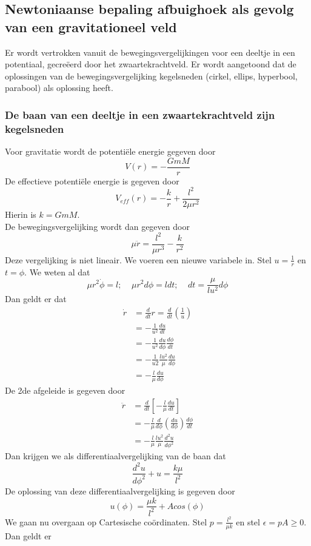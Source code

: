 \subsection{Newtoniaanse bepaling afbuighoek als gevolg van een gravitationeel veld}
Er wordt vertrokken vanuit de bewegingsvergelijkingen voor een deeltje in een potentiaal, gecreëerd door het zwaartekrachtveld. Er wordt aangetoond dat de oplossingen van de bewegingsvergelijking kegelsneden (cirkel, ellips, hyperbool, parabool) als oplossing heeft.
\subsubsection{De baan van een deeltje in een zwaartekrachtveld zijn kegelsneden}
Voor gravitatie wordt de potentiële energie gegeven door
$$V(r)=-\frac{GmM}{r}$$
De effectieve potentiële energie is gegeven door
$$V_{eff}(r)=-\frac{k}{r}+\frac{l^{2}}{2\mu r^{2}}$$
Hierin is $k=GmM$.\\
De bewegingsvergelijking wordt dan gegeven door
$$\mu\ddot{r}=\frac{l^{2}}{\mu r^{3}}-\frac{k}{r^{2}}$$
Deze vergelijking is niet lineair. We voeren een nieuwe variabele in. Stel $u=\frac{1}{r}$ en $t=\phi$. We weten al dat
$$\mu r^{2}\dot{\phi}=l;\ \ \ \ \ \mu r^{2}d\phi=ldt;\ \ \ \ \ dt=\frac{\mu}{lu^{2}}d\phi$$
Dan geldt er dat
\begin{align}
\dot{r}&=\frac{d}{dt}r=\frac{d}{dt}(\frac{1}{u}) \nonumber \\
&=-\frac{1}{u^{2}}\frac{du}{dt} \nonumber \\
&=-\frac{1}{u^{2}}\frac{du}{d\phi}\frac{d\phi}{dt} \nonumber \\
&=-\frac{1}{u{2}}\frac{lu^{2}}{\mu}\frac{du}{d\phi} \nonumber \\
&=-\frac{l}{\mu}\frac{du}{d\phi} \nonumber 
\end{align}
De 2de afgeleide is gegeven door
\begin{align}
\ddot{r}&=\frac{d}{dt}[-\frac{l}{\mu}\frac{du}{dt}] \nonumber \\
&=-\frac{l}{\mu}\frac{d}{d\phi}(\frac{du}{d\phi})\frac{d\phi}{dt} \nonumber \\
&=-\frac{l}{\mu}\frac{lu^{2}}{\mu}\frac{d^{2}u}{d\phi^{2}} \nonumber 
\end{align}
Dan krijgen we als differentiaalvergelijking van de baan dat
$$\frac{d^{2}u}{d\phi^{2}}+u=\frac{k\mu}{l^{2}}$$
De oplossing van deze differentiaalvergelijking is gegeven door
$$u(\phi)=\frac{\mu k}{l^{2}}+Acos(\phi)$$
We gaan nu overgaan op Cartesische coördinaten. Stel $p=\frac{l^{2}}{\mu k}$ en stel $\epsilon=pA\geq0$. Dan geldt er
